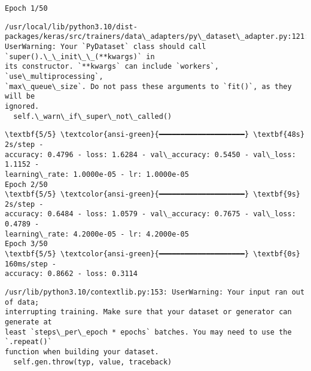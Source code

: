 \documentclass[11pt]{article}
\begin{document}
    \begin{Verbatim}[commandchars=\\\{\}]
Epoch 1/50
    \end{Verbatim}

    \begin{Verbatim}[commandchars=\\\{\}]
/usr/local/lib/python3.10/dist-
packages/keras/src/trainers/data\_adapters/py\_dataset\_adapter.py:121:
UserWarning: Your `PyDataset` class should call `super().\_\_init\_\_(**kwargs)` in
its constructor. `**kwargs` can include `workers`, `use\_multiprocessing`,
`max\_queue\_size`. Do not pass these arguments to `fit()`, as they will be
ignored.
  self.\_warn\_if\_super\_not\_called()
    \end{Verbatim}

    \begin{Verbatim}[commandchars=\\\{\}]
\textbf{5/5} \textcolor{ansi-green}{━━━━━━━━━━━━━━━━━━━━} \textbf{48s} 2s/step -
accuracy: 0.4796 - loss: 1.6284 - val\_accuracy: 0.5450 - val\_loss: 1.1152 -
learning\_rate: 1.0000e-05 - lr: 1.0000e-05
Epoch 2/50
\textbf{5/5} \textcolor{ansi-green}{━━━━━━━━━━━━━━━━━━━━} \textbf{9s} 2s/step -
accuracy: 0.6484 - loss: 1.0579 - val\_accuracy: 0.7675 - val\_loss: 0.4789 -
learning\_rate: 4.2000e-05 - lr: 4.2000e-05
Epoch 3/50
\textbf{5/5} \textcolor{ansi-green}{━━━━━━━━━━━━━━━━━━━━} \textbf{0s} 160ms/step -
accuracy: 0.8662 - loss: 0.3114
    \end{Verbatim}

    \begin{Verbatim}[commandchars=\\\{\}]
/usr/lib/python3.10/contextlib.py:153: UserWarning: Your input ran out of data;
interrupting training. Make sure that your dataset or generator can generate at
least `steps\_per\_epoch * epochs` batches. You may need to use the `.repeat()`
function when building your dataset.
  self.gen.throw(typ, value, traceback)
    \end{Verbatim}
\end{document}
